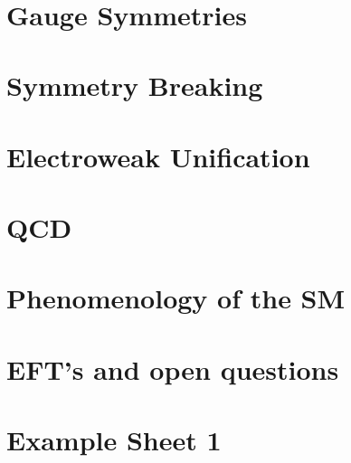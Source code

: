 \documentclass[11pt, oneside]{article}   	%
\theoremstyle{slanted}
\begin{document}
\

\section{Gauge Symmetries}%
\label{sec:gauge_symmetries}

\section{Symmetry Breaking}%
\label{sec:symmetry_breaking}

\section{Electroweak Unification}%
\label{sec:electroweak_unification}

\section{QCD}%
\label{sec:qcd}

\section{Phenomenology of the SM}%
\label{sec:phenomenology_of_the_sm}

\section{EFT's and open questions}%
\label{sec:eft_s_and_open_questions}



\pagebreak 
\section*{Example Sheet 1}
\end{document}
